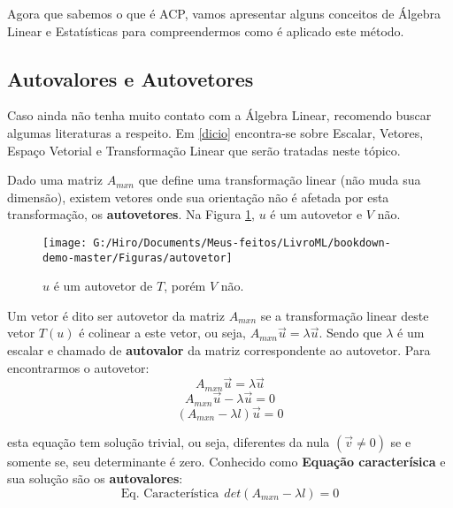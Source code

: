 \documentclass[
  openany]{book}
\begin{document}
Agora que sabemos o que é ACP, vamos apresentar alguns conceitos de Álgebra Linear e Estatísticas para compreendermos como é aplicado este método.

\hypertarget{autovalores-e-autovetores}{%
\subsection{Autovalores e Autovetores}\label{autovalores-e-autovetores}}

Caso ainda não tenha muito contato com a Álgebra Linear, recomendo buscar algumas literaturas a respeito. Em \ref{dicio} encontra-se sobre Escalar, Vetores, Espaço Vetorial e Transformação Linear que serão tratadas neste tópico.

Dado uma matriz \(A_{mxn}\) que define uma transformação linear (não muda sua dimensão), existem vetores onde sua orientação não é afetada por esta transformação, os \textbf{autovetores}. Na Figura \ref{fig:autovetor}, \(u\) é um autovetor e \(V\) não.

\begin{figure}

{\centering \texttt{[image: G:/Hiro/Documents/Meus-feitos/LivroML/bookdown-demo-master/Figuras/autovetor]} 

}

\caption{\(u\) é um autovetor de \(T\), porém \(V\) não.}\label{fig:autovetor}
\end{figure}



Um vetor é dito ser autovetor da matriz \(A_{mxn}\) se a transformação linear deste vetor \(T(u)\) é colinear a este vetor, ou seja, \(A_{mxn}\vec{u}=\lambda \vec{u}\). Sendo que \(\lambda\) é um escalar e chamado de \textbf{autovalor} da matriz correspondente ao autovetor. Para encontrarmos o autovetor:
\[A_{mxn}\vec{u}=\lambda \vec{u} \]
\[A_{mxn}\vec{u}-\lambda \vec{u}=0 \]
\begin{equation}
(A_{mxn}-\lambda l)\vec{u}=0
    \label{eq:autovetor}
\end{equation}

esta equação tem solução trivial, ou seja, diferentes da nula \((\vec{v}\neq 0 )\) se e somente se, seu determinante é zero. Conhecido como \textbf{Equação caracterísica} e sua solução são os \textbf{autovalores}:
\begin{equation}
    \mbox{Eq. Característica}\ \  det(A_{mxn}-\lambda l)=0  
    \label{eq:eqcarac}
\end{equation}
\end{document}
